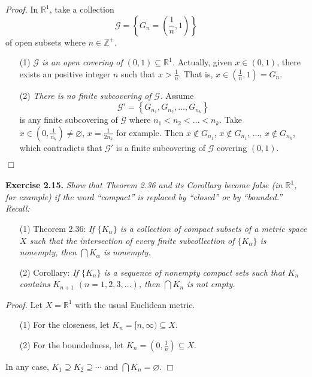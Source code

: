 \documentclass{article}
\begin{document}
\emph{Proof.}
In $\mathbb{R}^1$, take a collection
$$\mathscr{G} = \left\{ G_n = \left(\frac{1}{n}, 1\right) \right\}$$
of open subsets where $n \in \mathbb{Z}^+$.
\begin{enumerate}
\item[(1)]
\emph{$\mathscr{G}$ is an open covering of $(0, 1) \subseteq \mathbb{R}^1$.}
Actually, given $x \in (0, 1)$, there exists an positive integer $n$ such that $x > \frac{1}{n}$.
That is, $x \in \left(\frac{1}{n}, 1\right) = G_n$.
\item[(2)]
\emph{There is no finite subcovering of $\mathscr{G}$.}
Assume $$\mathscr{G}' = \left\{ G_{n_1}, G_{n_2}, ..., G_{n_k} \right\}$$
is any finite subcovering of $\mathscr{G}$ where $n_1 < n_2 < ... < n_k$.
Take $x \in \left(0, \frac{1}{n_k}\right) \neq \varnothing$,
$x = \frac{1}{2 n_k}$ for example.
Then $x \not\in G_{n_1}$, $x \not\in G_{n_1}$, ..., $x \not\in G_{n_k}$,
which contradicts that $\mathscr{G}'$ is a finite subcovering of $\mathscr{G}$ covering $(0, 1)$.
\end{enumerate}
$\Box$ \\\\






\textbf{Exercise 2.15.}
\emph{
Show that Theorem 2.36 and its Corollary become false
(in $\mathbb{R}^1$, for example) if the word ``compact''
is replaced by ``closed'' or by ``bounded.''} \\

\emph{Recall:}
\begin{enumerate}
\item[(1)]
Theorem 2.36:
\emph{If $\{K_\alpha\}$ is a collection of compact subsets of a metric space $X$
such that the intersection of every finite subcollection of $\{K_\alpha\}$ is nonempty,
then $\bigcap K_\alpha$ is nonempty.}
\item[(2)]
Corollary:
\emph{If $\{K_n\}$ is a sequence of nonempty compact sets such that $K_n$
contains $K_{n+1}$ $(n=1,2,3,\ldots)$, then $\bigcap K_n$ is not empty.} \\
\end{enumerate}

\emph{Proof.}
Let $X = \mathbb{R}^1$ with the usual Euclidean metric.
\begin{enumerate}
\item[(1)]
For the closeness, let $K_n = [n,\infty) \subseteq X$.
\item[(2)]
For the boundedness, let $K_n = \left(0, \frac{1}{n}\right) \subseteq X$.
\end{enumerate}
In any case, $K_1 \supseteq K_2 \supseteq \cdots$ and $\bigcap K_n = \varnothing$.
$\Box$ \\\\
\end{document}
